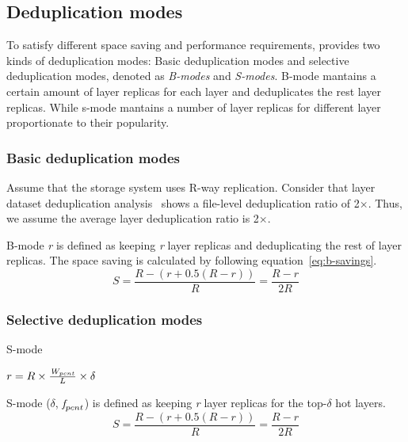 \subsection{Deduplication modes}
\label{sec:dedup-mode}

To satisfy different space saving and performance requirements,
\sysname provides two kinds of deduplication modes:
Basic deduplication modes and selective deduplication modes, denoted as \emph{B-modes} and \emph{S-modes}.
B-mode mantains a certain amount of layer replicas for each layer and deduplicates the rest layer replicas.
While s-mode mantains a number of layer replicas for different layer proportionate to their popularity.

\subsubsection{Basic deduplication modes}
Assume that the storage system uses R-way replication.
Consider that layer dataset deduplication analysis~\cite{xxx} shows a file-level deduplication ratio of 2$\times$.
Thus, we assume the average layer deduplication ratio is 2$\times$.

B-mode \emph{r} is defined as keeping \emph{r} layer replicas and deduplicating the rest of layer replicas. 
The space saving is calculated by following equation~\ref{eq:b-savings}.
\begin{equation}\label{eq:b-savings}
S = \frac{R-(r+0.5(R-r))}{R} = \frac{R-r}{2R}
\end{equation}


\subsubsection{Selective deduplication modes}
S-mode

$r = R \times \frac{\emph{W}_{pcnt}}{L} \times \delta$

S-mode ($\delta$, $\emph{f}_{pcnt}$) is defined as keeping \emph{r} layer replicas for the top-$\delta$ hot layers.
\begin{equation}\label{eq:s-savings}
S = \frac{R-(r+0.5(R-r))}{R} = \frac{R-r}{2R}
\end{equation}